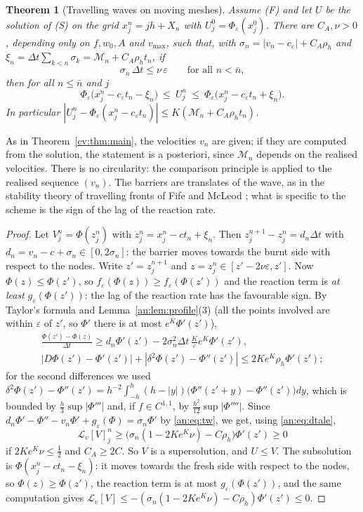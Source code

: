 \documentclass[11pt]{amsart}
\newtheorem{theorem}{Theorem}[section]
\theoremstyle{definition}
\theoremstyle{remark}
\newcommand{\ve}{\varepsilon}
\newcommand{\Lop}{\mathcal{L}}
\begin{document}
\begin{theorem}[Travelling waves on moving meshes]\label{an:thm:ale}
Assume (F) and let $U$ be the solution of (S) on the grid $x^n_j=jh+X_n$ with
$U^0_j=\Phi_\ve(x^0_j)$. There are $C_A,\nu>0$, depending only on $f,w_0,A$ and $v_{\max}$, such
that, with $\sigma_n=|v_n-c_\ve|+C_A\rho_h$ and
$\xi_n=\Delta t\sum_{k<n}\sigma_k=\mathcal M_n+C_A\rho_ht_n$, if
\begin{equation}\label{an:eq:dtale}
\sigma_n\,\Delta t\le\nu\,\ve\qquad\text{for all }n<\bar n,
\end{equation}
then for all $n\le\bar n$ and $j$
\[
\Phi_\ve\big(x^n_j-c_\ve t_n-\xi_n\big)\ \le\ U^n_j\ \le\ \Phi_\ve\big(x^n_j-c_\ve t_n+\xi_n\big).
\]
In particular $|U^n_j-\Phi_\ve(x^n_j-c_\ve t_n)|\le K(\mathcal M_n+C_A\rho_ht_n)$.
\end{theorem}

As in Theorem~\ref{cv:thm:main}, the velocities $v_n$ are given; if they are computed from
the solution, the statement is a posteriori, since $\mathcal M_n$ depends on the realised
velocities. There is no circularity: the comparison principle is applied to the realised
sequence $(v_n)$. The barriers are translates of the wave, as in the stability theory of
travelling fronts of Fife and McLeod \cite{FifeMcLeod1977}; what is specific to the scheme
is the sign of the lag of the reaction rate.

\begin{proof}
Let $V^n_j=\Phi(z^n_j)$ with $z^n_j=x^n_j-ct_n+\xi_n$. Then
$z^{n+1}_j-z^n_j=d_n\Delta t$ with $d_n=v_n-c+\sigma_n\in[0,2\sigma_n]$: the barrier moves
towards the burnt side with respect to the nodes. Write $z'=z^{n+1}_j$ and
$z=z^n_j\in[z'-2\nu\ve,z']$. Now $\Phi(z)\le\Phi(z')$, so
$f_\ve(\Phi(z))\ge f_\ve(\Phi(z'))$ and the reaction term is \emph{at least}
$g_\ve(\Phi(z'))$: the lag of the reaction rate has the favourable sign. By Taylor's
formula and Lemma~\ref{an:lem:profile}(3) (all the points involved are within $\ve$ of
$z'$, so $\Phi'$ there is at most $e^K\Phi'(z')$),
\begin{gather*}
\frac{\Phi(z')-\Phi(z)}{\Delta t}\ge d_n\Phi'(z')-2\sigma_n^2\Delta t\,\tfrac K\ve e^K\Phi'(z'),\\
|D\Phi(z')-\Phi'(z')|+|\delta^2\Phi(z')-\Phi''(z')|\le2Ke^K\rho_h\Phi'(z') ;
\end{gather*}
for the second differences we used
$\delta^2\Phi(z')-\Phi''(z')=h^{-2}\int_{-h}^h(h-|y|)\big(\Phi''(z'+y)-\Phi''(z')\big)dy$, which is
bounded by $\frac h3\sup|\Phi'''|$ and, if $f\in C^{1,1}$, by $\frac{h^2}{12}\sup|\Phi''''|$. Since
$d_n\Phi'-\Phi''-v_n\Phi'+g_\ve(\Phi)=\sigma_n\Phi'$ by \eqref{an:eq:tw}, we get, using
\eqref{an:eq:dtale},
\[
\Lop_v[V]^n_j\ge\big(\sigma_n(1-2Ke^K\nu)-C\rho_h\big)\Phi'(z')\ge0
\]
if $2Ke^K\nu\le\frac12$ and $C_A\ge2C$. So $V$ is a supersolution, and $U\le V$. The
subsolution is $\Phi(x^n_j-ct_n-\xi_n)$: it moves towards the fresh side with respect to
the nodes, so $\Phi(z)\ge\Phi(z')$, the reaction term is at most $g_\ve(\Phi(z'))$, and the
same computation gives $\Lop_v[V]\le-(\sigma_n(1-2Ke^K\nu)-C\rho_h)\Phi'(z')\le0$.
\end{proof}
\end{document}
